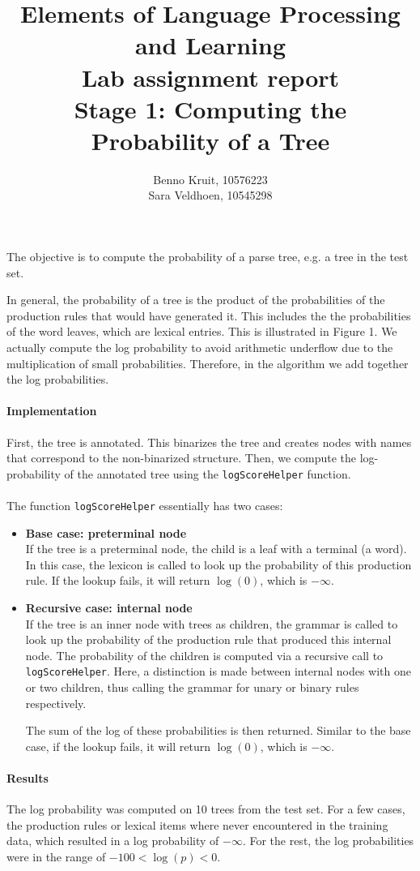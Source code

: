 \documentclass{article}
\title{Elements of Language Processing and Learning\\
Lab assignment report\\
Stage 1: Computing the Probability of a Tree}
\author{Benno Kruit, 10576223\\Sara Veldhoen, 10545298}
\begin{document}
\maketitle

The objective is to compute the probability of a parse tree, e.g. a tree in the test set. 


In general, the probability of a tree is the product of the probabilities of the production rules that would have generated it.
This includes the the probabilities of the word leaves, which are lexical entries. This is illustrated in Figure 1.
We actually compute the log probability to avoid arithmetic underflow due to the multiplication of small probabilities. Therefore, in the algorithm we add together the log probabilities.

\begin{figure}[h]

\end{figure}

\paragraph{Implementation}
First, the tree is annotated. This binarizes the tree and creates nodes with names that correspond to the non-binarized structure. Then, we compute the log-probability of the annotated tree using the \texttt{logScoreHelper} function.

\paragraph{}
The function \texttt{logScoreHelper} essentially has two cases:
\begin{itemize}
	\item \textbf{Base case: preterminal node}\\
	 If the tree is a preterminal node, the child is a leaf with a terminal (a word). In this case, the lexicon is called to look up the probability of this production rule. If the lookup fails, it will return $\log(0)$, which is $-\infty$.
	\item \textbf{Recursive case: internal node}\\
	 If the tree is an inner node with trees as children, the grammar is called to look up  the probability of the production rule that produced this internal node. The probability of the children is computed via a recursive call to \texttt{logScoreHelper}. Here, a distinction is made between internal nodes with one or two children, thus calling the grammar for unary or binary rules respectively.

 The sum of the log of these probabilities is then returned. Similar to the base case, if the lookup fails,  it will return $\log(0)$, which is $-\infty$.
\end{itemize}

\paragraph{Results}
The log probability was computed on 10 trees from the test set.
For a few cases, the production rules or lexical items where never encountered in the training data, which resulted in a log probability of $-\infty$. For the rest, the log probabilities were in the range of $-100 < \log(p) < 0$.
\end{document}
